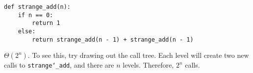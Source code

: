 \begin{blocksection}
\question  \begin{lstlisting}
def strange_add(n):
    if n == 0:
        return 1
    else:
        return strange_add(n - 1) + strange_add(n - 1)
\end{lstlisting}

\begin{solution}
$\Theta(2^n)$. To see this, try drawing out the call tree. Each level will create
two new calls to \texttt{strange\char`_add}, and there are $n$ levels.
Therefore, $2^n$ calls.
\end{solution}
\end{blocksection}
